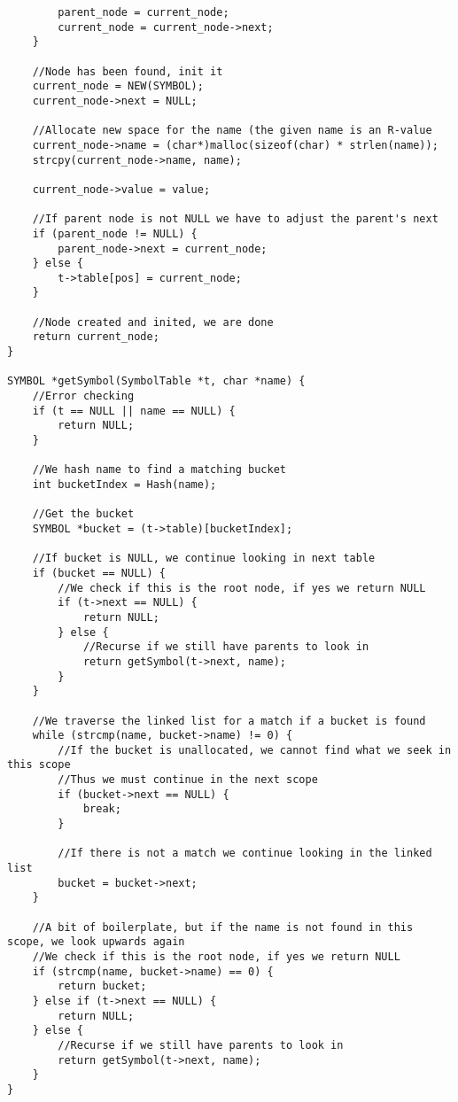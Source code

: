 \documentclass[a4paper]{article}
\begin{document}
\begin{verbatim}
        parent_node = current_node;
        current_node = current_node->next;
    }

    //Node has been found, init it
    current_node = NEW(SYMBOL);
    current_node->next = NULL;

    //Allocate new space for the name (the given name is an R-value
    current_node->name = (char*)malloc(sizeof(char) * strlen(name));
    strcpy(current_node->name, name);

    current_node->value = value;
    
    //If parent node is not NULL we have to adjust the parent's next
    if (parent_node != NULL) {
        parent_node->next = current_node;
    } else {
        t->table[pos] = current_node;
    }

    //Node created and inited, we are done
    return current_node;
}

SYMBOL *getSymbol(SymbolTable *t, char *name) {
    //Error checking
    if (t == NULL || name == NULL) {
        return NULL;
    }

    //We hash name to find a matching bucket
    int bucketIndex = Hash(name);

    //Get the bucket
    SYMBOL *bucket = (t->table)[bucketIndex];

    //If bucket is NULL, we continue looking in next table
    if (bucket == NULL) {
        //We check if this is the root node, if yes we return NULL
        if (t->next == NULL) {
            return NULL;
        } else {
            //Recurse if we still have parents to look in
            return getSymbol(t->next, name);
        }
    }

    //We traverse the linked list for a match if a bucket is found
    while (strcmp(name, bucket->name) != 0) {
        //If the bucket is unallocated, we cannot find what we seek in this scope
        //Thus we must continue in the next scope
        if (bucket->next == NULL) {
            break;
        }

        //If there is not a match we continue looking in the linked list
        bucket = bucket->next;
    }

    //A bit of boilerplate, but if the name is not found in this scope, we look upwards again
    //We check if this is the root node, if yes we return NULL
    if (strcmp(name, bucket->name) == 0) {
        return bucket;
    } else if (t->next == NULL) {
        return NULL;
    } else {
        //Recurse if we still have parents to look in
        return getSymbol(t->next, name);
    }
}


\end{verbatim}
\end{document}
